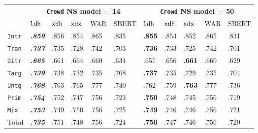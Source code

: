 \documentclass[xcolor={dvipsnames}]{beamer}
\newcommand{\feat}[1]{\textsc{#1}}
\newcommand{\param}[1]{\texttt{#1}}
\begin{document}
\begin{frame}
\begin{table}[htb!]
\begin{center}
\setlength{\tabcolsep}{.35em}
\begin{tabular}{|l||l|l|l||l|l||l|l|l||l|l|}
\hline
 & \multicolumn{5}{c||}{\param{Crowd} NS model = 14} & \multicolumn{5}{c|}{\param{Crowd} NS model = 50} \\
\hline
    		& \param{ldh}	& \param{xdh} &	\param{xdx} & WAR	& {\scriptsize SBERT} & \param{ldh}	& \param{xdh} &	\param{xdx} & WAR	& {\scriptsize SBERT} \\ \hline
\hline
\param{Intr}   & \textbf{\textit{.859}} & .856 & .854 & .865 & .835  & \textbf{.855} & .854 & .852 & .865 & .831 \\ \hline
\param{Tran}    & \textit{\textbf{.737}} & .735 & .728 & .742 & .703   & \textbf{.736} & .733 & .725 & .742 & .701 \\ \hline
\param{Ditr}    & \textit{\textbf{.665}} & .661 & .664 & .660 & .634  & .657 & .656 & \textbf{.661} & .660 & .629 \\ \hline
\hline
\param{Targ}    & \textit{\textbf{.739}} & .738 & .732 & .735 & .708  & \textbf{.737} & .735 & .729 & .735 & .704 \\ \hline
\param{Untg}    & \textit{\textbf{.768}} & .763 & .765 & .777 & .740  & .762 & .759 & \textbf{.763} & .777 & .736 \\ \hline
\hline
\param{Prim}    & \textit{\textbf{.754}} & .752 & .747 & .756 & .723  & \textbf{.750} & .748 & .745 & .756 & .719 \\ \hline
\param{Mix}      & \textit{\textbf{.753}} & .749 & .750 & .756 & .725  & \textbf{.749} & .746 & .746 & .756 & .721 \\ \hline
\hline
Total 	 & \textit{\textbf{.735}} & .751 & .748 & .756 & .724 	& \textbf{.750} & .747 & .746 & .756 & .720 \\ \hline
\end{tabular}
\end{center}
\end{table}


\end{frame}
\end{document}
